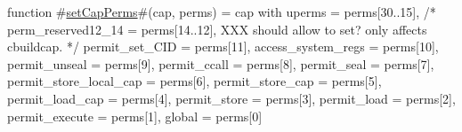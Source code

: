function #\hyperref[zsetCapPerms]{setCapPerms}#(cap, perms) =
    { cap with
      uperms                 = perms[30..15],
      /* perm_reserved12_14     = perms[14..12], XXX should allow to set? only affects cbuildcap. */
      permit_set_CID         = perms[11],
      access_system_regs     = perms[10],
      permit_unseal          = perms[9],
      permit_ccall           = perms[8],
      permit_seal            = perms[7],
      permit_store_local_cap = perms[6],
      permit_store_cap       = perms[5],
      permit_load_cap        = perms[4],
      permit_store           = perms[3],
      permit_load            = perms[2],
      permit_execute         = perms[1],
      global                 = perms[0]
   }
